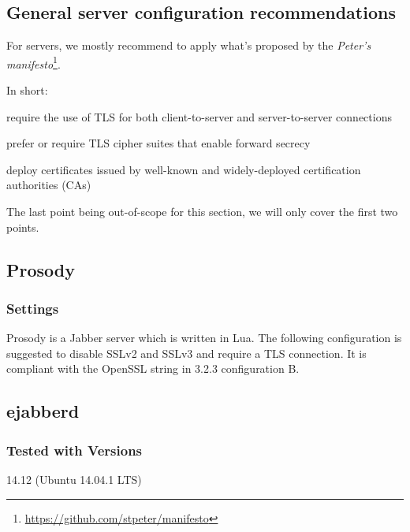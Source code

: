 \gdef\currentsectionname{IM}
\subsection{General server configuration recommendations}

For servers, we mostly recommend to apply what's proposed by the \emph{Peter's manifesto}\footnote{\url{https://github.com/stpeter/manifesto}}.

In short:
\begin{itemize*}
    \item require the use of TLS for both client-to-server and server-to-server connections
    \item prefer or require TLS cipher suites that enable forward secrecy
    \item deploy certificates issued by well-known and widely-deployed certification authorities (CAs)
\end{itemize*}

The last point being out-of-scope for this section, we will only cover the first two points.


\subsection{Prosody}
\subsubsection{Settings}
Prosody is a Jabber server which is written in Lua. 
The following configuration is suggested to disable SSLv2 and SSLv3 and require a TLS connection. It is compliant with the OpenSSL string in 3.2.3 configuration B.




\subsection{ejabberd}

\subsubsection{Tested with Versions}
\begin{itemize*}
  \item 14.12 (Ubuntu 14.04.1 LTS)
\end{itemize*}

